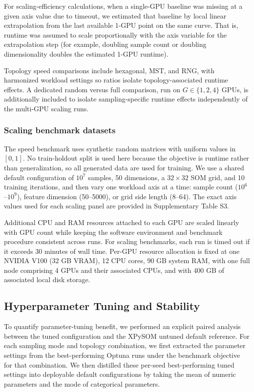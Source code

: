 \documentclass[11pt]{article}
\begin{document}
For scaling-efficiency calculations, when a single-GPU baseline was missing at a given axis value due to timeout, we estimated that baseline by local linear extrapolation from the last available 1-GPU point on the same curve. That is, runtime was assumed to scale proportionally with the axis variable for the extrapolation step (for example, doubling sample count or doubling dimensionality doubles the estimated 1-GPU runtime).

Topology speed comparisons include hexagonal, MST, and RNG, with harmonized workload settings so ratios isolate topology-associated runtime effects. A dedicated random versus full comparison, run on $G\in\{1,2,4\}$ GPUs, is additionally included to isolate sampling-specific runtime effects independently of the multi-GPU scaling runs.

\subsubsection{Scaling benchmark datasets}

The speed benchmark uses synthetic random matrices with uniform values in $[0,1]$. No train-holdout split is used here because the objective is runtime rather than generalization, so all generated data are used for training. We use a shared default configuration of $10^7$ samples, 50 dimensions, a $32 \times 32$ SOM grid, and 10 training iterations, and then vary one workload axis at a time: sample count ($10^6$--$10^9$), feature dimension (50--5000), or grid side length (8--64). The exact axis values used for each scaling panel are provided in Supplementary Table S3.

Additional CPU and RAM resources attached to each GPU are scaled linearly with GPU count while keeping the software environment and benchmark procedure consistent across runs. For scaling benchmarks, each run is timed out if it exceeds 30 minutes of wall time. Per-GPU resource allocation is fixed at one NVIDIA V100 (32 GB VRAM), 12 CPU cores, 90 GB system RAM, with one full node comprising 4 GPUs and their associated CPUs, and with 400 GB of associated local disk storage.

\subsection{Hyperparameter Tuning and Stability}

To quantify parameter-tuning benefit, we performed an explicit paired analysis between the tuned configuration and the XPySOM untuned default reference. For each sampling mode and topology combination, we first extracted the parameter settings from the best-performing Optuna runs under the benchmark objective for that combination. We then distilled these per-seed best-performing tuned settings into deployable default configurations by taking the mean of numeric parameters and the mode of categorical parameters.
\end{document}
